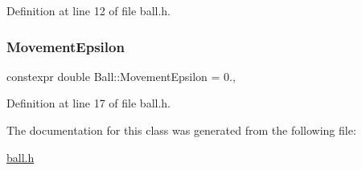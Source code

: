 Definition at line 12 of file ball.\+h.

\mbox{\label{class_ball_a6b8169e6104a6fbcd29f81a7375bb031}} 
\subsubsection{\texorpdfstring{Movement\+Epsilon}{MovementEpsilon}}
{\footnotesize\ttfamily constexpr double Ball\+::\+Movement\+Epsilon = 0.\hspace{0.3cm}{\ttfamily [static]}, {\ttfamily [protected]}}



Definition at line 17 of file ball.\+h.



The documentation for this class was generated from the following file\+:\begin{DoxyCompactItemize}
\item 
\mbox{\hyperlink{ball_8h}{ball.\+h}}\end{DoxyCompactItemize}
